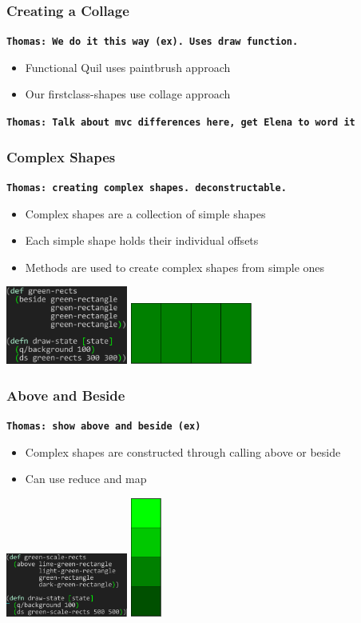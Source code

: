 \documentclass{beamer}
\newcommand{\comment}[1]{{\bf \tt  {#1}}}
\newcommand{\thcomment}[1]{\textcolor{BestBlue}{\comment{Thomas: {#1}}}}
\begin{document}
\begin{frame}
\frametitle{Creating a Collage}
\thcomment{We do it this way (ex). Uses draw function.}
	\begin{itemize}
		\item Functional Quil uses paintbrush approach
		\item Our firstclass-shapes use collage approach
	\end{itemize}
\thcomment{Talk about mvc differences here, get Elena to word it}
\end{frame}

\begin{frame}
\frametitle{Complex Shapes}
\thcomment{creating complex shapes. deconstructable.}
	\begin{itemize}
		\item Complex shapes are a collection of simple shapes
		\item Each simple shape holds their individual offsets
		\item Methods are used to create complex shapes from simple ones
	\end{itemize}
	\includegraphics[width=4cm]{PresentationImages/fcsGreenRects.png}
	\includegraphics[width=4cm]{PresentationImages/4GreenRects.png}
\end{frame}

\begin{frame}
\frametitle{Above and Beside}
\thcomment{show above and beside (ex)}
	\begin{itemize}
		\item Complex shapes are constructed through calling above or beside
		\item Can use reduce and map
	\end{itemize}
	\includegraphics[width=4cm]{PresentationImages/greenScaleRects.png}
	\includegraphics[width=1cm]{PresentationImages/greenScaleTower.png}
\end{frame}
\end{document}
